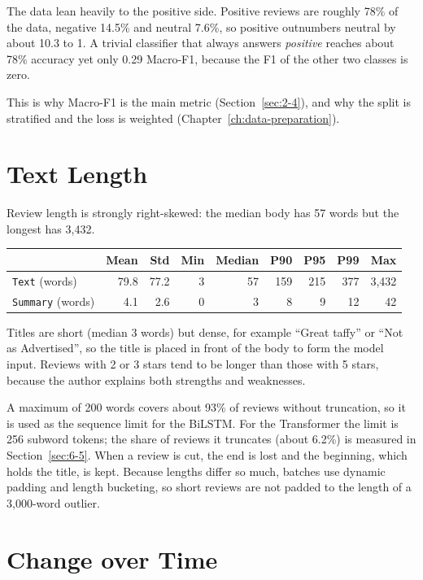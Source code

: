 The data lean heavily to the positive side. Positive reviews are roughly 78\% of the data, negative 14.5\% and neutral 7.6\%, so positive outnumbers neutral by about 10.3 to 1. A trivial classifier that always answers \emph{positive} reaches about 78\% accuracy yet only 0.29 Macro-F1, because the F1 of the other two classes is zero.

This is why Macro-F1 is the main metric (Section~\ref{sec:2-4}), and why the split is stratified and the loss is weighted (Chapter~\ref{ch:data-preparation}).

\section{Text Length}
\label{sec:4-4}

Review length is strongly right-skewed: the median body has 57 words but the longest has 3{,}432.

\begin{center}
\small
\begin{tabular}{@{}lrrrrrrrr@{}}
    \toprule
     & Mean & Std & Min & Median & P90 & P95 & P99 & Max \\
    \midrule
    \texttt{Text} (words) & 79.8 & 77.2 & 3 & 57 & 159 & 215 & 377 & 3{,}432 \\
    \texttt{Summary} (words) & 4.1 & 2.6 & 0 & 3 & 8 & 9 & 12 & 42 \\
    \bottomrule
\end{tabular}
\end{center}

Titles are short (median 3 words) but dense, for example ``Great taffy'' or ``Not as Advertised'', so the title is placed in front of the body to form the model input. Reviews with 2 or 3 stars tend to be longer than those with 5 stars, because the author explains both strengths and weaknesses.

A maximum of 200 words covers about 93\% of reviews without truncation, so it is used as the sequence limit for the BiLSTM. For the Transformer the limit is 256 subword tokens; the share of reviews it truncates (about 6.2\%) is measured in Section~\ref{sec:6-5}. When a review is cut, the end is lost and the beginning, which holds the title, is kept. Because lengths differ so much, batches use dynamic padding and length bucketing, so short reviews are not padded to the length of a 3{,}000-word outlier.

\section{Change over Time}
\label{sec:4-5}

